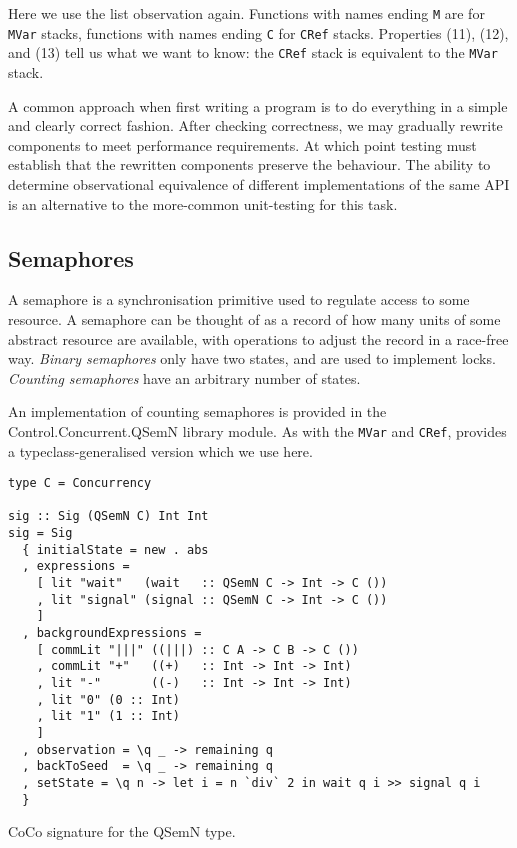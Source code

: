 \noindent
Here we use the list observation again.  Functions with names ending
\verb|M| are for \verb|MVar| stacks, functions with names ending
\verb|C| for \verb|CRef| stacks.  Properties (11), (12),
and (13) tell us what we want to know: the \verb|CRef| stack is
equivalent to the \verb|MVar| stack.

A common approach when first writing a program is to do everything in
a simple and clearly correct fashion.  After checking correctness, we
may gradually rewrite components to meet performance requirements.  At
which point testing must establish that the rewritten components
preserve the behaviour.  The ability to determine observational
equivalence of different implementations of the same API is an
alternative to the more-common unit-testing for this
task\cite{he1986}.

\subsection*{Semaphores}
\label{sec:coco-cases-semaphore}

A semaphore is a synchronisation primitive used to regulate access to
some resource.  A semaphore can be thought of as a record of how many
units of some abstract resource are available, with operations to
adjust the record in a race-free way.  \emph{Binary semaphores} only
have two states, and are used to implement locks. \emph{Counting
  semaphores} have an arbitrary number of states.

An implementation of counting semaphores is provided in the
Control.Concurr\-ent.QSemN library module.  As with the \verb|MVar| and
\verb|CRef|, \dejafu{} provides a typeclass-generalised version which
we use here.

\begin{listing}
\begin{verbatim}
type C = Concurrency

sig :: Sig (QSemN C) Int Int
sig = Sig
  { initialState = new . abs
  , expressions =
    [ lit "wait"   (wait   :: QSemN C -> Int -> C ())
    , lit "signal" (signal :: QSemN C -> Int -> C ())
    ]
  , backgroundExpressions =
    [ commLit "|||" ((|||) :: C A -> C B -> C ())
    , commLit "+"   ((+)   :: Int -> Int -> Int)
    , lit "-"       ((-)   :: Int -> Int -> Int)
    , lit "0" (0 :: Int)
    , lit "1" (1 :: Int)
    ]
  , observation = \q _ -> remaining q
  , backToSeed  = \q _ -> remaining q
  , setState = \q n -> let i = n `div` 2 in wait q i >> signal q i
  }
\end{verbatim}
\caption{CoCo signature for the QSemN type.}
\label{lst:sig}
\end{listing}

